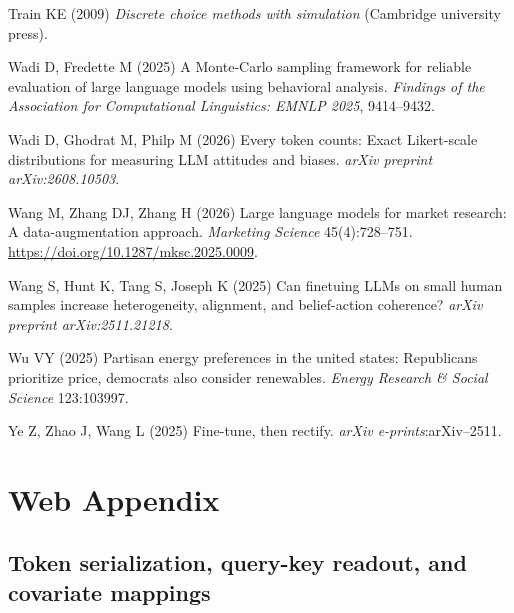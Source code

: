 \documentclass[
  11pt,
  letterpaper,
]{article}
\newlength{\cslhangindent}
\newenvironment{CSLReferences}[2] %
 {\begin{list}{}{%
  \setlength{\itemindent}{0pt}
  \setlength{\leftmargin}{0pt}
  \setlength{\parsep}{0pt}
  \ifodd #1
   \setlength{\leftmargin}{\cslhangindent}
   \setlength{\itemindent}{-1\cslhangindent}
  \fi
  \setlength{\itemsep}{#2\baselineskip}}}
 {\end{list}}
\begin{document}
\begin{CSLReferences}{1}{0}
Train KE (2009) \emph{Discrete choice methods with simulation}
(Cambridge university press).

Wadi D, Fredette M (2025) A {Monte-Carlo} sampling framework for
reliable evaluation of large language models using behavioral analysis.
\emph{Findings of the {Association for Computational Linguistics}:
{EMNLP} 2025}, 9414--9432.

Wadi D, Ghodrat M, Philp M (2026) Every token counts: Exact
{Likert}-scale distributions for measuring LLM attitudes and biases.
\emph{arXiv preprint arXiv:2608.10503}.

Wang M, Zhang DJ, Zhang H (2026) Large language models for market
research: A data-augmentation approach. \emph{Marketing Science}
45(4):728--751. \url{https://doi.org/10.1287/mksc.2025.0009}.

Wang S, Hunt K, Tang S, Joseph K (2025) Can finetuing LLMs on small
human samples increase heterogeneity, alignment, and belief-action
coherence? \emph{arXiv preprint arXiv:2511.21218}.

Wu VY (2025) Partisan energy preferences in the united states:
Republicans prioritize price, democrats also consider renewables.
\emph{Energy Research \& Social Science} 123:103997.

Ye Z, Zhao J, Wang L (2025) Fine-tune, then rectify. \emph{arXiv
e-prints}:arXiv--2511.

\end{CSLReferences}

\newpage{}

\section*{Web Appendix}\label{web-appendix}

\subsection*{Token serialization, query-key readout, and covariate
mappings}\label{token-serialization-query-key-readout-and-covariate-mappings}
\end{document}
